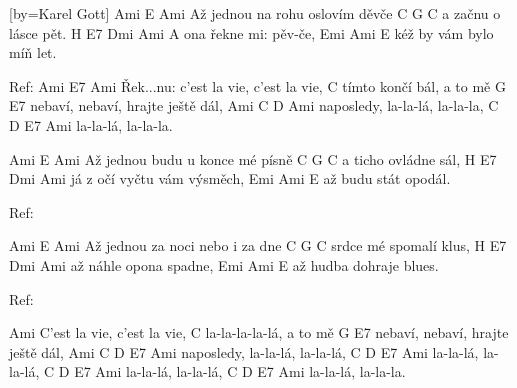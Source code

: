 [by=Karel Gott]
\beginverse
          Ami     E       Ami
Až jednou na rohu oslovím děvče
C     G       C
a začnu o lásce pět.
H     E7        Dmi Ami
A ona řekne mi: pěv-če,
Emi        Ami      E
kéž by vám bylo míň let.

Ref:
Ami   E7  Ami
Řek...nu: c'est la vie, c'est la vie,
C
tímto končí bál, a to mě
G                            E7
nebaví, nebaví, hrajte ještě dál,
Ami C     D         Ami
naposledy, la-la-lá, la-la-la,
C     D   E7    Ami
la-la-lá, la-la-la.

Ami     E       Ami
Až jednou budu u konce mé písně
C     G       C
a ticho ovládne sál,
H        E7        Dmi Ami
já z očí vyčtu vám výsměch,
Emi     Ami     E 
až budu stát opodál.

Ref:

Ami     E       Ami
Až jednou za noci nebo i za dne
C        G       C
srdce mé spomalí klus,
H        E7    Dmi Ami
až náhle opona spadne, 
Emi      Ami     E
až hudba dohraje blues.

Ref:

Ami
C'est la vie, c'est la vie,
C
la-la-la-la-lá, a to mě
G                            E7
nebaví, nebaví, hrajte ještě dál,
Ami C     D   E7    Ami
naposledy, la-la-lá, la-la-lá,
C     D   E7    Ami
la-la-lá, la-la-lá,
C     D   E7    Ami
la-la-lá, la-la-lá,
C     D   E7    Ami
la-la-lá, la-la-la.
\endverse